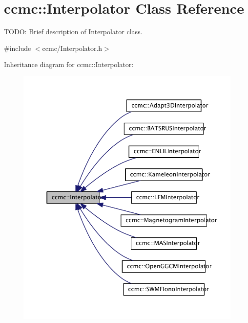 \hypertarget{classccmc_1_1_interpolator}{\section{ccmc\-:\-:Interpolator Class Reference}
\label{classccmc_1_1_interpolator}
}


T\-O\-D\-O\-: Brief description of \hyperlink{classccmc_1_1_interpolator}{Interpolator} class.  




{\ttfamily \#include $<$ccmc/\-Interpolator.\-h$>$}



Inheritance diagram for ccmc\-:\-:Interpolator\-:\nopagebreak
\begin{figure}[H]
\begin{center}
\leavevmode
\includegraphics[width=350pt]{classccmc_1_1_interpolator__inherit__graph}
\end{center}
\end{figure}


